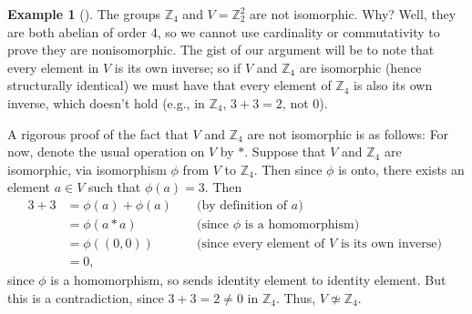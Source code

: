 \documentclass[10pt,]{book}
\theoremstyle{plain}
\theoremstyle{definition}
\theoremstyle{definition}
\theoremstyle{definition}
\newtheorem{example}[theorem]{Example}
\theoremstyle{definition}
\numberwithin{equation}{section}
\def\Z{\mathbb{Z}}
\newcommand{\amp}{&}
\begin{document}
\begin{example}[]\label{x4nonunique}
The groups \(\Z_4\) and \(V=\Z_2^2\) are not isomorphic. Why? Well, they are both abelian of order 4, so we cannot use cardinality or commutativity to prove they are nonisomorphic. The gist of our argument will be to note that every element in \(V\) is its own inverse; so if \(V\) and \(\Z_4\) are isomorphic (hence structurally identical) we must have that every element of \(\Z_4\) is also its own inverse, which doesn't hold (e.g., in \(\Z_4\), \(3+3=2\), not \(0\)).%
\par
A rigorous proof of the fact that \(V\) and \(\Z_4\) are not isomorphic is as follows: For now, denote the usual operation on \(V\) by \(*\). Suppose that \(V\) and \(\Z_4\) are isomorphic, via isomorphism \(\phi\) from \(V\) to \(\Z_4\). Then since \(\phi\) is onto, there exists an element \(a\in V\) such that \(\phi(a)=3\). Then%
\begin{align*}
3+3\amp =\phi(a)+\phi(a)\amp \amp \text{ (by definition of \(a\)) }\\
\amp =\phi(a*a) \amp \amp \text{ (since \(\phi\) is a homomorphism) }\\
\amp =\phi((0,0)) \amp \amp \text{ (since every element of \(V\) is its own inverse) }\\
\amp =0, \amp \amp
\end{align*}
since \(\phi\) is a homomorphism, so sends identity element to identity element. But this is a contradiction, since \(3+3=2\neq 0\) in \(\Z_4\). Thus, \(V\not\simeq \Z_4\).%
\end{example}
\typeout{************************************************}
\typeout{************************************************}
\end{document}
